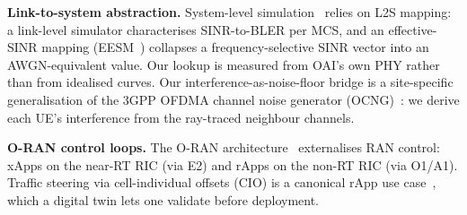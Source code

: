 \documentclass[conference]{IEEEtran}
\begin{document}
\textbf{Link-to-system abstraction.} System-level simulation~\cite{tr36814} relies on L2S mapping: a link-level simulator characterises SINR-to-BLER per MCS, and an effective-SINR mapping (EESM~\cite{eesm,eesm_orig}) collapses a frequency-selective SINR vector into an AWGN-equivalent value. Our lookup is measured from OAI's own PHY rather than from idealised curves. Our interference-as-noise-floor bridge is a site-specific generalisation of the 3GPP OFDMA channel noise generator (OCNG)~\cite{ocng}: we derive each UE's interference from the ray-traced neighbour channels.

\textbf{O-RAN control loops.} The O-RAN architecture~\cite{oran,orantraffic} externalises RAN control: xApps on the near-RT RIC (via E2) and rApps on the non-RT RIC (via O1/A1). Traffic steering via cell-individual offsets (CIO) is a canonical rApp use case~\cite{dt_survey}, which a digital twin lets one validate before deployment.


\end{document}
